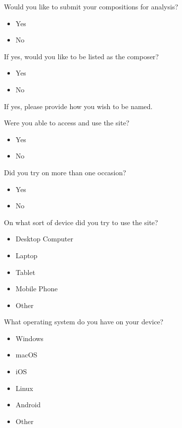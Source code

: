 \noindent Would you like to submit your compositions for analysis?

\begin{itemize}
	\item Yes
	\item No
\end{itemize}

\noindent If yes, would you like to be listed as the composer?

\begin{itemize}
	\item Yes
	\item No
\end{itemize}

\noindent If yes, please provide how you wish to be named.

\vspace{\baselineskip}

\noindent Were you able to access and use the site?

\begin{itemize}
	\item Yes
	\item No
\end{itemize}

\noindent Did you try on more than one occasion?

\begin{itemize}
	\item Yes
	\item No
\end{itemize}

\noindent On what sort of device did you try to use the site?

\begin{itemize}
	\item Desktop Computer
	\item Laptop
	\item Tablet
	\item Mobile Phone
	\item Other
\end{itemize}

\noindent What operating system do you have on your device?

\begin{itemize}
	\item Windows
	\item macOS
	\item iOS
	\item Linux
	\item Android
	\item Other
\end{itemize}

